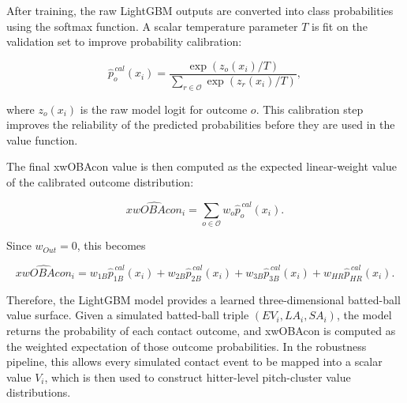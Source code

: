 \documentclass[11pt]{article}
\begin{document}
After training, the raw LightGBM outputs are converted into class probabilities using the softmax function. A scalar temperature parameter \(T\) is fit on the validation set to improve probability calibration:

\begin{equation}
    \hat{p}_o^{\,cal}(x_i)
    =
    \frac{
        \exp\left(z_o(x_i)/T\right)
    }{
        \sum_{r \in \mathcal{O}}
        \exp\left(z_r(x_i)/T\right)
    },
\end{equation}

where \(z_o(x_i)\) is the raw model logit for outcome \(o\). This calibration step improves the reliability of the predicted probabilities before they are used in the value function.

The final xwOBAcon value is then computed as the expected linear-weight value of the calibrated outcome distribution:

\begin{equation}
    \widehat{xwOBAcon}_i
    =
    \sum_{o \in \mathcal{O}}
    w_o
    \hat{p}_o^{\,cal}(x_i).
\end{equation}

Since \(w_{Out}=0\), this becomes

\begin{equation}
    \widehat{xwOBAcon}_i
    =
    w_{1B}\hat{p}_{1B}^{\,cal}(x_i)
    +
    w_{2B}\hat{p}_{2B}^{\,cal}(x_i)
    +
    w_{3B}\hat{p}_{3B}^{\,cal}(x_i)
    +
    w_{HR}\hat{p}_{HR}^{\,cal}(x_i).
\end{equation}

Therefore, the LightGBM model provides a learned three-dimensional batted-ball value surface. Given a simulated batted-ball triple \((EV_i, LA_i, SA_i)\), the model returns the probability of each contact outcome, and xwOBAcon is computed as the weighted expectation of those outcome probabilities. In the robustness pipeline, this allows every simulated contact event to be mapped into a scalar value \(V_i\), which is then used to construct hitter-level pitch-cluster value distributions.
\end{document}
